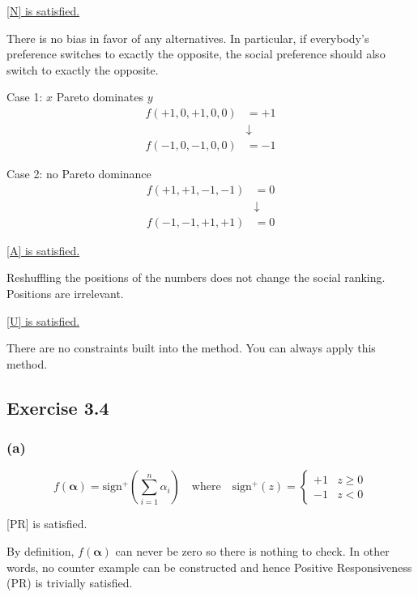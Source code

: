 \documentclass[a4paper]{article}
\begin{document}
\underline{[N] is satisfied.}

There is no bias in favor of any alternatives. In particular, if everybody's preference switches to exactly the opposite, the social preference should also switch to exactly the opposite.

Case 1: $x$ Pareto dominates $y$
\begin{align*}
    f(+1, 0, +1, 0, 0) &= +1 \\
                       & \downarrow \\
    f(-1, 0, -1, 0, 0) &= -1                   
\end{align*}

Case 2: no Pareto dominance
\begin{align*}
    f(+1, +1, -1, -1) &= 0 \\
                      & \downarrow \\
    f(-1, -1, +1, +1) &= 0
\end{align*}

\underline{[A] is satisfied.}

Reshuffling the positions of the numbers does not change the social ranking. Positions are irrelevant.

\underline{[U] is satisfied.}

There are no constraints built into the method. You can always apply this method.

\subsection*{Exercise 3.4}

\subsubsection*{(a)}

\begin{equation*}
    f(\boldsymbol{\alpha})=\text{sign}^{+}\left(\sum_{i=1}^{n}\alpha_i \right) \quad 
    \text{where}\quad 
    \text{sign}^{+}(z)=
    \begin{cases}
        +1 & z\geq 0 \\
        -1 & z<0
    \end{cases}
\end{equation*}

[PR] is satisfied.

By definition, $f(\boldsymbol{\alpha})$ can never be zero so there is nothing to check. In other words, no counter example can be constructed and hence Positive Responsiveness (PR) is trivially satisfied.
\end{document}
